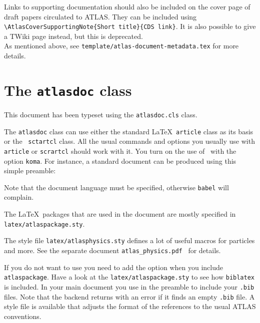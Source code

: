 Links to supporting documentation should also be included on the cover page of draft papers circulated to ATLAS.
They can be included using
\verb|\AtlasCoverSupportingNote{Short title}{CDS link}|.
It is also possible to give a TWiki page instead, but this is deprecated.\\
As mentioned above, see \texttt{template/atlas-document-metadata.tex} for more details.


\section{The \texttt{atlasdoc} class}
\label{app:atlasdoc}

This document has been typeset using the \texttt{atlasdoc.cls} class.

The \texttt{atlasdoc} class can use either the standard \LaTeX\ \texttt{article} class
as its basis or the \KOMAScript\ \texttt{sctartcl} class.
All the usual commands and options you usually use
with \texttt{article}  or \texttt{scrartcl} should work with it. 
You turn on the use of \KOMAScript\ with the option \texttt{koma}.
For instance, a standard document can be produced using this simple preamble:
%
%
Note that the document language must be specified, otherwise \texttt{babel} will complain.

The \LaTeX\ packages that are used in the document are mostly specified in 
\texttt{latex/atlaspackage.sty}.

The style file \texttt{latex/atlasphysics.sty} defines a lot of useful
macros for particles and more. See the separate document
\texttt{atlas\_physics.pdf}~\cite{atlas-physics} for details.

If you do not want to use  you need to add the option  when you
include \texttt{atlaspackage}.
Have a look at the \texttt{latex/atlaspackage.sty} to see how \texttt{biblatex} is included.
In your main document you use  in the preamble to include your \texttt{.bib} files.
Note that the backend  returns with an error if it finds an empty \texttt{.bib} file.
A style file  is available that adjusts the format of the references to the usual ATLAS conventions.

